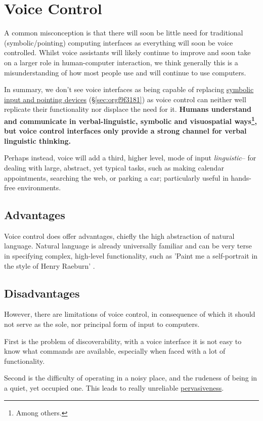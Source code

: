 \documentclass[logo,bsc,singlespacing,parskip]{infthesis}
\begin{document}
\section{Voice Control}
\label{sec:org7530d42}
A common misconception is that there will soon be little need for traditional (symbolic/pointing) computing interfaces as everything will soon be voice controlled.
Whilst voice assistants will likely continue to improve and soon take on a larger role in human-computer interaction, we think generally this is a misunderstanding of how most people use and will continue to use computers.

In summary, we don't see voice interfaces as being capable of replacing \hyperref[sec:orgf9f3181]{symbolic input and pointing devices} (\S \ref{sec:orgf9f3181}) as voice control can neither well replicate their functionality nor displace the need for it.
\textbf{Humans understand and communicate in verbal-linguistic, symbolic and visuospatial ways\footnote{Among others.}, but voice control interfaces only provide a strong channel for verbal linguistic thinking.}

Perhaps instead, voice will add a third, higher level, mode of input \emph{linguistic}-- for dealing with large, abstract, yet typical tasks, such as making calendar appointments, searching the web, or parking a car; particularly useful in hands-free environments.

\subsection{Advantages}
\label{sec:org23effc5}
Voice control does offer advantages, chiefly the high abstraction of natural language.
Natural language is already universally familiar and can be very terse in specifying complex, high-level functionality, such as 'Paint me a self-portrait in the style of Henry Raeburn' \autocite{DALLa}.

\subsection{Disadvantages}
\label{sec:org51a10b2}
However, there are limitations of voice control, in consequence of which it should not serve as the sole, nor principal form of input to computers.

First is the problem of discoverability, with a voice interface it is not easy to know what commands are available, especially when faced with a lot of functionality.

Second is the difficulty of operating in a noisy place, and the rudeness of being in a quiet, yet occupied one.
This leads to really unreliable \hyperref[pervasiveness]{pervasiveness}.
\end{document}
